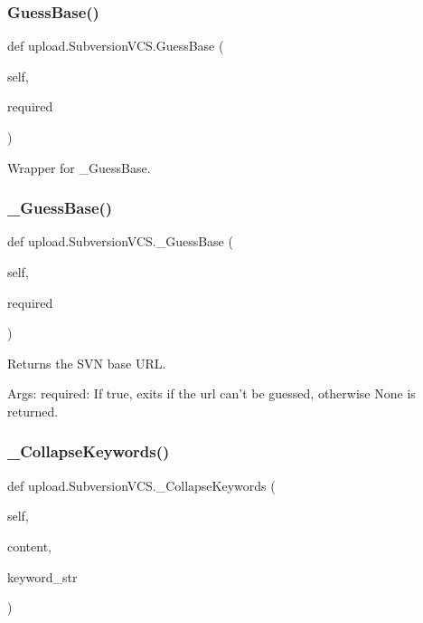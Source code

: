 \subsubsection{\texorpdfstring{Guess\+Base()}{GuessBase()}}
{\footnotesize\ttfamily def upload.\+Subversion\+V\+C\+S.\+Guess\+Base (\begin{DoxyParamCaption}\item[{}]{self,  }\item[{}]{required }\end{DoxyParamCaption})}

\begin{DoxyVerb}Wrapper for _GuessBase.\end{DoxyVerb}
 \mbox{\label{classupload_1_1_subversion_v_c_s_ad257205675d7d9d291145f4aa405964b}} 
\subsubsection{\texorpdfstring{\+\_\+\+Guess\+Base()}{\_GuessBase()}}
{\footnotesize\ttfamily def upload.\+Subversion\+V\+C\+S.\+\_\+\+Guess\+Base (\begin{DoxyParamCaption}\item[{}]{self,  }\item[{}]{required }\end{DoxyParamCaption})\hspace{0.3cm}{\ttfamily [private]}}

\begin{DoxyVerb}Returns the SVN base URL.

Args:
  required: If true, exits if the url can't be guessed, otherwise None is
returned.
\end{DoxyVerb}
 \mbox{\label{classupload_1_1_subversion_v_c_s_ab484ddd61e217927fb61639bacdbb68d}} 
\subsubsection{\texorpdfstring{\+\_\+\+Collapse\+Keywords()}{\_CollapseKeywords()}}
{\footnotesize\ttfamily def upload.\+Subversion\+V\+C\+S.\+\_\+\+Collapse\+Keywords (\begin{DoxyParamCaption}\item[{}]{self,  }\item[{}]{content,  }\item[{}]{keyword\+\_\+str }\end{DoxyParamCaption})\hspace{0.3cm}{\ttfamily [private]}}

